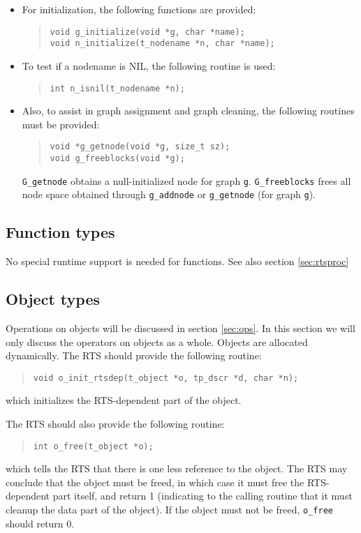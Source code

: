 \documentclass[10pt]{article}
\begin{document}
\begin{itemize}
\item
For initialization, the following functions are provided:
\begin{quote}
\begin{verbatim}
void g_initialize(void *g, char *name);
void n_initialize(t_nodename *n, char *name);
\end{verbatim}
\end{quote}
\item
To test if a nodename is NIL, the following routine is used:
\begin{quote}
\begin{verbatim}
int n_isnil(t_nodename *n);
\end{verbatim}
\end{quote}
\item
Also, to assist in graph assignment and graph cleaning, the following
routines must be provided:
\begin{quote}
\begin{verbatim}
void *g_getnode(void *g, size_t sz);
void g_freeblocks(void *g);
\end{verbatim}
\end{quote}
\verb+G_getnode+ obtains a null-initialized node for graph \verb+g+.
\verb+G_freeblocks+ frees all node space obtained through \verb+g_addnode+
or \verb+g_getnode+ (for graph \verb+g+).
\end{itemize}

\subsection{Function types}
No special runtime support is needed for functions.
See also section \ref{sec:rtsproc}

\subsection{Object types}
Operations on objects will be discussed in section \ref{sec:ops}.
In this section we will only discuss the operators on objects as a whole.
Objects are allocated dynamically.
The RTS should provide the following routine:
\begin{quote}
\begin{verbatim}
void o_init_rtsdep(t_object *o, tp_dscr *d, char *n);
\end{verbatim}
\end{quote}
which initializes the RTS-dependent part of the object.

The RTS should also provide the following routine:
\begin{quote}
\begin{verbatim}
int o_free(t_object *o);
\end{verbatim}
\end{quote}
which tells the RTS that there is one less reference to the object.
The RTS may conclude that the object must be freed, in which case it
must free the RTS-dependent part itself, and return 1 (indicating to the
calling routine that it must cleanup the data part of the object).
If the object must not be freed, \verb+o_free+ should return 0.
\end{document}

